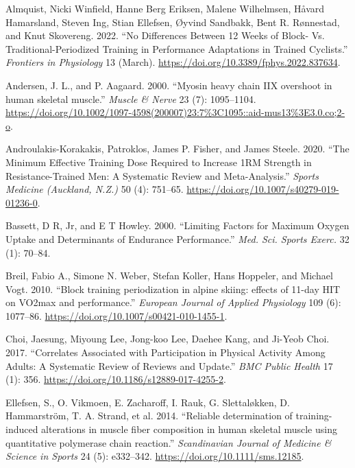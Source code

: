 \documentclass[
  letterpaper,
  DIV=11,
  numbers=noendperiod]{scrreprt}
\newlength{\cslhangindent}
\newenvironment{CSLReferences}[2] %
 {\begin{list}{}{%
  \setlength{\itemindent}{0pt}
  \setlength{\leftmargin}{0pt}
  \setlength{\parsep}{0pt}
  \ifodd #1
   \setlength{\leftmargin}{\cslhangindent}
   \setlength{\itemindent}{-1\cslhangindent}
  \fi
  \setlength{\itemsep}{#2\baselineskip}}}
 {\end{list}}
\begin{document}

\label{refs}
\begin{CSLReferences}{1}{0}
Almquist, Nicki Winfield, Hanne Berg Eriksen, Malene Wilhelmsen, Håvard
Hamarsland, Steven Ing, Stian Ellefsen, Øyvind Sandbakk, Bent R.
Rønnestad, and Knut Skovereng. 2022. {``No Differences Between 12 Weeks
of Block- Vs. Traditional-Periodized Training in Performance Adaptations
in Trained Cyclists.''} \emph{Frontiers in Physiology} 13 (March).
\url{https://doi.org/10.3389/fphys.2022.837634}.

Andersen, J. L., and P. Aagaard. 2000. {``Myosin heavy chain IIX
overshoot in human skeletal muscle.''} \emph{Muscle \& Nerve} 23 (7):
1095--1104.
\url{https://doi.org/10.1002/1097-4598(200007)23:7\%3C1095::aid-mus13\%3E3.0.co;2-o}.

Androulakis-Korakakis, Patroklos, James P. Fisher, and James Steele.
2020. {``The Minimum Effective Training Dose Required to Increase 1RM
Strength in Resistance-Trained Men: A Systematic Review and
Meta-Analysis.''} \emph{Sports Medicine (Auckland, N.Z.)} 50 (4):
751--65. \url{https://doi.org/10.1007/s40279-019-01236-0}.

Bassett, D R, Jr, and E T Howley. 2000. {``Limiting Factors for Maximum
Oxygen Uptake and Determinants of Endurance Performance.''} \emph{Med.
Sci. Sports Exerc.} 32 (1): 70--84.

Breil, Fabio A., Simone N. Weber, Stefan Koller, Hans Hoppeler, and
Michael Vogt. 2010. {``Block training periodization in alpine skiing:
effects of 11-day HIT on VO2max and performance.''} \emph{European
Journal of Applied Physiology} 109 (6): 1077--86.
\url{https://doi.org/10.1007/s00421-010-1455-1}.

Choi, Jaesung, Miyoung Lee, Jong-koo Lee, Daehee Kang, and Ji-Yeob Choi.
2017. {``Correlates Associated with Participation in Physical Activity
Among Adults: A Systematic Review of Reviews and Update.''} \emph{BMC
Public Health} 17 (1): 356.
\url{https://doi.org/10.1186/s12889-017-4255-2}.

Ellefsen, S., O. Vikmoen, E. Zacharoff, I. Rauk, G. Slettaløkken, D.
Hammarström, T. A. Strand, et al. 2014. {``Reliable determination of
training-induced alterations in muscle fiber composition in human
skeletal muscle using quantitative polymerase chain reaction.''}
\emph{Scandinavian Journal of Medicine \& Science in Sports} 24 (5):
e332--342. \url{https://doi.org/10.1111/sms.12185}.


\end{CSLReferences}
\end{document}
